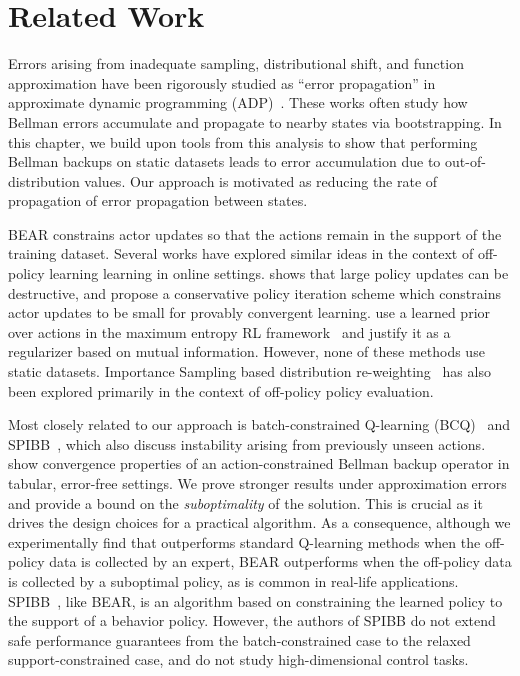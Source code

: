 \vspace{-0.2cm}
\section{Related Work}
\label{sec:related}
\vspace{-0.2cm}

Errors arising from inadequate sampling, distributional shift, and function approximation have been rigorously studied as ``error propagation'' in approximate dynamic programming (ADP)~\citep{bertsekas1996ndp,munos2003errorapi,farahmand2010error,bruno2015approximate}. These works often study how Bellman errors accumulate and propagate to nearby states via bootstrapping. In this chapter, we build upon tools from this analysis to show that performing Bellman backups on static datasets leads to error accumulation due to out-of-distribution values. Our approach is motivated as reducing the rate of propagation of error propagation between states.

BEAR constrains actor updates so that the actions remain in the support of the training dataset. Several works have explored similar ideas in the context of off-policy learning learning in online settings. \citet{kakade2002cpi} shows that large policy updates can be destructive, and propose a conservative policy iteration scheme which constrains actor updates to be small for provably convergent learning. \citet{grau-moya2018soft} use a learned prior over actions in the maximum entropy RL framework~\citep{levine2018rlasinference} and justify it as a regularizer based on mutual information. However, none of these methods use static datasets. Importance Sampling based distribution re-weighting~\cite{munos2016safe,gelada2019off,precup2001offpol,mahmood2015emphatic} has also been explored primarily in the context of off-policy policy evaluation.

Most closely related to our approach is batch-constrained Q-learning (BCQ)~\citep{fujimoto2018off} and SPIBB~\citep{laroche2017safe}, which also discuss instability arising from previously unseen actions. \citet{fujimoto2018off} show convergence properties of an action-constrained Bellman backup operator in tabular, error-free settings. We prove stronger results under approximation errors and provide a bound on the \emph{suboptimality} of the solution. This is crucial as it drives the design choices for a practical algorithm. As a consequence, although we experimentally find that \citep{fujimoto2018off} outperforms standard Q-learning methods when the off-policy data is collected by an expert, BEAR outperforms \cite{fujimoto2018off} when the off-policy data is collected by a suboptimal policy, as is common in real-life applications. SPIBB~\citep{laroche2017safe}, like BEAR, is an algorithm based on constraining the learned policy to the support of a behavior policy. However, the authors of SPIBB do not extend safe performance guarantees from the batch-constrained case to the relaxed support-constrained case, and do not study high-dimensional control tasks. 
